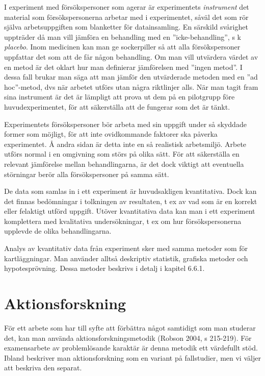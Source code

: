 I experiment med försökspersoner som agerar är experimentets
\emph{instrument} det material som försökspersonerna arbetar med i
experimentet, såväl det som rör själva arbetsuppgiften som blanketter
för datainsamling. En särskild svårighet uppträder då man vill jämföra
en behandling med en ''icke-behandling'', s k \emph{placebo}. Inom
medicinen kan man ge sockerpiller så att alla försökspersoner uppfattar
det som att de får någon behandling. Om man vill utvärdera värdet av en
metod är det oklart hur man definierar jämförelsen med ''ingen metod''.
I dessa fall brukar man säga att man jämför den utvärderade metoden med
en ''ad hoc''-metod, dvs när arbetet utförs utan några riktlinjer alls.
När man tagit fram sina instrument är det är lämpligt att prova ut dem
på en pilotgrupp före huvudexperimentet, för att säkerställa att de
fungerar som det är tänkt.

Experimentets försökspersoner bör arbeta med sin uppgift under så
skyddade former som möjligt, för att inte ovidkommande faktorer ska
påverka experimentet. Å andra sidan är detta inte en så realistisk
arbetsmiljö. Arbete utförs normal i en omgivning som störs på olika
sätt. För att säkerställa en relevant jämförelse mellan behandlingarna,
är det dock viktigt att eventuella störningar berör alla försökspersoner
på samma sätt.

De data som samlas in i ett experiment är huvudsakligen kvantitativa.
Dock kan det finnas bedömningar i tolkningen av resultaten, t ex av vad
som är en korrekt eller felaktigt utförd uppgift. Utöver kvantitativa
data kan man i ett experiment komplettera med kvalitativa
undersökningar, t ex om hur försökspersonerna upplevde de olika
behandlingarna.

Analys av kvantitativ data från experiment sker med samma metoder som
för kartläggningar. Man använder alltså deskriptiv statistik, grafiska
metoder och hypotesprövning. Dessa metoder beskrivs i detalj i kapitel
6.6.1.

\section{Aktionsforskning }\label{aktionsforskning}

För ett arbete som har till syfte att förbättra något samtidigt som man
studerar det, kan man använda aktionsforskningsmetodik (Robson 2004, s
215-219). För examensarbete av problemlösande karaktär är denna metodik
ett värdefullt stöd. Ibland beskriver man aktionsforskning som en
variant på fallstudier, men vi väljer att beskriva den separat.

